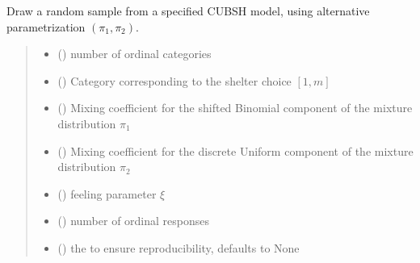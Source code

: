 \documentclass[letterpaper,10pt,english]{sphinxmanual}
\begin{document}

\begin{fulllineitems}
\label{\detokenize{cubmods:cubmods.cubsh.draw}}
\pysigstartsignatures
{}
\pysigstopsignatures
\sphinxAtStartPar
Draw a random sample from a specified CUBSH model,
using alternative parametrization \((\pi_1, \pi_2)\).
\begin{quote}\begin{description}
\begin{itemize}
\item {} 
\sphinxAtStartPar
{} () \textendash{} number of ordinal categories

\item {} 
\sphinxAtStartPar
{} () \textendash{} Category corresponding to the shelter choice \([1,m]\)

\item {} 
\sphinxAtStartPar
{} () \textendash{} Mixing coefficient for the shifted Binomial component of the mixture distribution \(\pi_1\)

\item {} 
\sphinxAtStartPar
{} () \textendash{} Mixing coefficient for the discrete Uniform component of the mixture distribution \(\pi_2\)

\item {} 
\sphinxAtStartPar
{} () \textendash{} feeling parameter \(\xi\)

\item {} 
\sphinxAtStartPar
{} () \textendash{} number of ordinal responses

\item {} 
\sphinxAtStartPar
{} (\sphinxstyleliteralemphasis{\sphinxupquote{, }}) \textendash{} the  to ensure reproducibility, defaults to None


\end{itemize}
\end{description}
\end{quote}
\end{fulllineitems}
\end{document}
